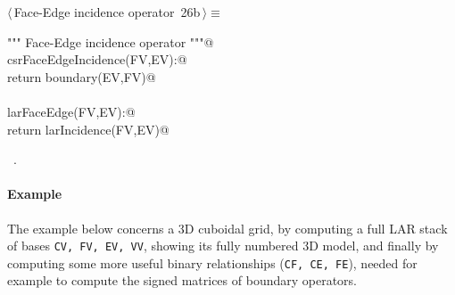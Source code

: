 \documentclass[11pt,oneside]{article}	%
\begin{document}
\begin{flushleft} \small \label{scrap42}
\protect{}$\langle\,$Face-Edge incidence operator\nobreak\ {\footnotesize 26b}$\,\rangle\equiv$
\vspace{-1ex}
\begin{list}{}{} \item
\mbox{}\verb@""" Face-Edge incidence operator """@\\
\mbox{}\verb@def csrFaceEdgeIncidence(FV,EV):@\\
\mbox{}\verb@   return boundary(EV,FV)@\\
\mbox{}\verb@@\\
\mbox{}\verb@def larFaceEdge(FV,EV):@\\
\mbox{}\verb@   return larIncidence(FV,EV)@\\
\mbox{}\verb@@{\NWsep}
\end{list}
\vspace{-1ex}
\footnotesize\addtolength{\baselineskip}{-1ex}
\begin{list}{}{\setlength{\itemsep}{-\parsep}\setlength{\itemindent}{-\leftmargin}}
\item \NWtxtMacroRefIn\ .
\end{list}
\end{flushleft}


\paragraph{Example}
The example below concerns a 3D cuboidal grid, by computing a full LAR stack of bases
\texttt{CV, FV, EV, VV}, showing its fully numbered 3D model, and finally by computing
some more useful binary relationships (\texttt{CF, CE, FE}), needed for example to compute the signed matrices of boundary operators.
\end{document}
